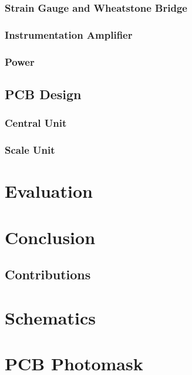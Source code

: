 \documentclass{l3proj}
\begin{document}
\subsection{Strain Gauge and Wheatstone Bridge}




\subsection{Instrumentation Amplifier}
\label{ina}


\subsection{Power}


\section{PCB Design}
\label{pcb}


\subsection{Central Unit}


\subsection{Scale Unit}

\chapter{Evaluation}

\chapter{Conclusion}


\section{Contributions}



\newpage
\appendix
\chapter{Schematics}
\chapter{PCB Photomask}




\end{document}
